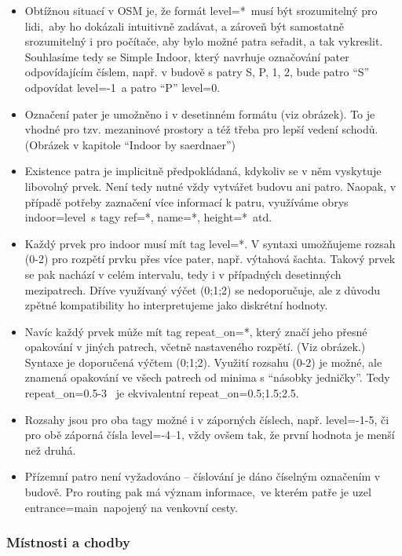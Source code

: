 \begin{itemize}
\tightlist
\item
  Obtížnou situací v OSM je, že formát level=*~musí být srozumitelný pro lidi,~aby ho dokázali intuitivně zadávat, a zároveň být samostatně srozumitelný i pro počítače, aby bylo možné patra seřadit, a tak vykreslit. Souhlasíme tedy se Simple Indoor, který navrhuje označování pater odpovídajícím číslem, např. v budově s patry S, P, 1, 2, bude patro ``S'' odpovídat level=-1~a patro ``P'' level=0.
\item
  Označení pater je umožněno i v desetinném formátu (viz obrázek). To je vhodné pro tzv. mezaninové prostory a též třeba pro lepší vedení schodů. (Obrázek v kapitole ``Indoor by saerdnaer'')
\item
  Existence patra je implicitně předpokládaná, kdykoliv se v něm vyskytuje libovolný prvek. Není tedy nutné vždy vytvářet budovu ani patro. Naopak, v případě potřeby zaznačení více informací k patru, využíváme obrys indoor=level~s tagy ref=*, name=*, height=*~atd.
\item
  Každý prvek pro indoor musí mít tag level=*. V syntaxi umožňujeme rozsah (0-2) pro rozpětí prvku přes více pater, např. výtahová šachta. Takový prvek se pak nachází v celém intervalu, tedy i v případných desetinných mezipatrech. Dříve využívaný výčet (0;1;2) se nedoporučuje, ale z důvodu zpětné kompatibility ho interpretujeme jako diskrétní hodnoty.
\item
  Navíc každý prvek může mít tag repeat\_on=*, který značí jeho přesné opakování v jiných patrech, včetně nastaveného rozpětí. (Viz obrázek.) Syntaxe je doporučená výčtem (0;1;2). Využití rozsahu (0-2) je možné, ale znamená opakování ve všech patrech od minima s ``násobky jedničky''. Tedy repeat\_on=0.5-3~ je ekvivalentní repeat\_on=0.5;1.5;2.5.
\item
  Rozsahy jsou pro oba tagy možné i v záporných číslech, např. level=-1-5, či pro obě záporná čísla level=-4--1, vždy ovšem tak, že první hodnota je menší než druhá.
\item
  Přízemní patro není vyžadováno -- číslování je dáno číselným označením v budově. Pro routing pak má význam informace,~ve kterém patře je uzel entrance=main~napojený na venkovní cesty.
\end{itemize}

\subsubsection{Místnosti a chodby}\label{muxedstnosti-a-chodby}


